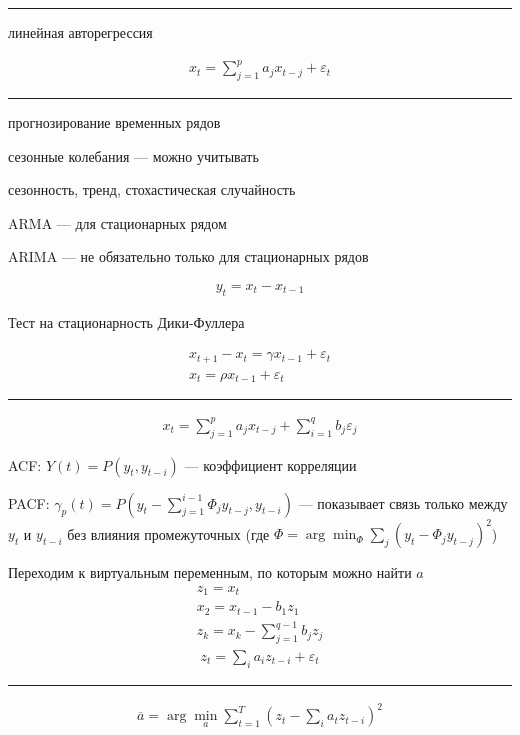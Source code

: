 \documentclass{book}
\begin{document}
\hrule

линейная авторегрессия

\begin{gather*}
  x_t=\sum_{j=1}^{p} {a_jx_{t-j}}+\varepsilon_t
\end{gather*}

\hrule

прогнозирование временных рядов

сезонные колебания --- можно учитывать

сезонность, тренд, стохастическая случайность

ARMA --- для стационарных рядом

ARIMA --- не обязательно только для стационарных рядов

\begin{gather*}
  y_t=x_t-x_{t-1}
\end{gather*}


Тест на стационарность Дики-Фуллера

\begin{gather*}
  x_{t+1}-x_t=\gamma x_{t-1}+\varepsilon_t\\
  x_t=\rho x_{t-1}+\varepsilon_t
\end{gather*}

\hrule

\begin{gather*}
  x_t=\sum_{j=1}^{p} {a_jx_{t-j}}+\sum_{i=1}^{q} {b_j\varepsilon_j}
\end{gather*}

ACF: $Y(t)=P(y_t, y_{t-i})$ --- коэффициент корреляции

PACF: $\gamma_p(t)=P(y_t-\sum_{j=1}^{i-1} {\Phi_jy_{t-j}},y_{t-i})$ ---
показывает связь только между $y_t$ и $y_{t-i}$ без влияния промежуточных (где $\Phi=\arg\min_\Phi \sum_{j} {(y_t-\Phi_j y_{t-j})^2}$)


Переходим к виртуальным переменным, по которым можно найти $a$
\begin{gather*}
  z_1=x_t\\
  x_2=x_{t-1}-b_1z_1\\
  z_k=x_k-\sum_{j=1}^{q-1} {b_jz_j}
\end{gather*}
\begin{gather*}
  z_t=\sum_{i}^{} {a_i z_{t-i}}+\varepsilon_t
\end{gather*}

\hrule

\begin{gather*}
  \overline{a}=\arg\min_a \sum_{t=1}^{T} {\left(z_t-\sum_{i}^{} {a_t z_{t-i}}\right)^2}
\end{gather*}
\end{document}
